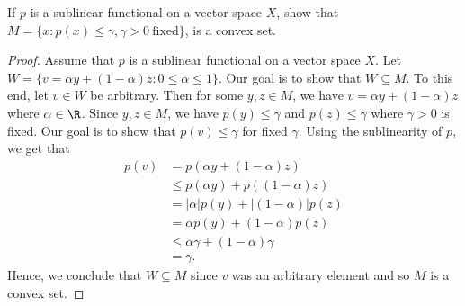 \begin{problem}
    If \( p  \) is a sublinear functional on a vector space \( X  \), show that \( M = \{ x : p(x) \leq \gamma , \gamma > 0 \ \text{fixed}  \}  \), is a convex set.
\end{problem}
\begin{proof}
Assume that \( p  \) is a sublinear functional on a vector space \( X  \). Let \( W = \{  v  = \alpha y + (1 - \alpha) z : 0 \leq \alpha \leq 1  \}  \). Our goal is to show that \( W \subseteq  M   \). To this end, let \( v \in W  \) be arbitrary. Then for some \( y,z \in M  \), we have \( v = \alpha y + (1- \alpha) z  \) where \( \alpha \in \R  \). Since \( y,z \in M  \), we have \( p(y) \leq \gamma \) and \( p(z) \leq \gamma \) where \( \gamma > 0   \) is fixed. Our goal is to show that \( p(v) \leq \gamma \) for fixed \( \gamma \). Using the sublinearity of \( p  \), we get that 
\begin{align*}
    p(v) &= p(\alpha y  + (1 - \alpha)z) \\
         &\leq p(\alpha y ) + p((1- \alpha) z) \\
         &= |\alpha| p(y) + |(1-\alpha)| p(z) \\
         &= \alpha p(y) + (1- \alpha) p(z) \tag{\( 0 \leq \alpha \leq 1\)}  \\
         &\leq \alpha \gamma + (1- \alpha) \gamma \\ 
         &= \gamma. 
\end{align*}
Hence, we conclude that \( W \subseteq  M  \) since \( v  \) was an arbitrary element and so \( M  \) is a convex set. 
\end{proof}


